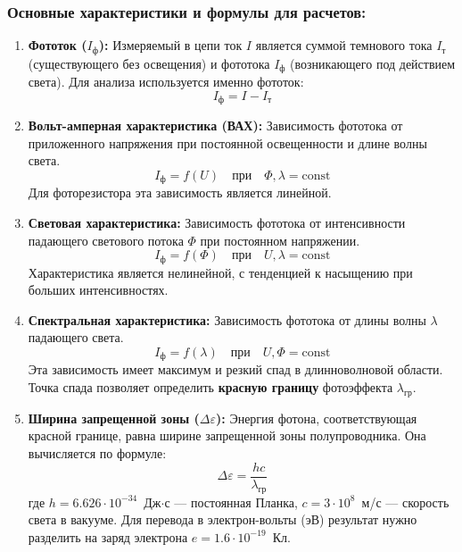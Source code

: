 \subsubsection*{Основные характеристики и формулы для расчетов:}
\begin{enumerate}
    \item \textbf{Фототок ($I_\text{ф}$):} Измеряемый в цепи ток $I$ является суммой темнового тока $I_\text{т}$ (существующего без освещения) и фототока $I_\text{ф}$ (возникающего под действием света). Для анализа используется именно фототок:
    \[ I_\text{ф} = I - I_\text{т} \]
    
    \item \textbf{Вольт-амперная характеристика (ВАХ):} Зависимость фототока от приложенного напряжения при постоянной освещенности и длине волны света.
    \[ I_\text{ф} = f(U) \quad \text{при} \quad \Phi, \lambda = \text{const} \]
    Для фоторезистора эта зависимость является линейной.
    
    \item \textbf{Световая характеристика:} Зависимость фототока от интенсивности падающего светового потока $\Phi$ при постоянном напряжении.
    \[ I_\text{ф} = f(\Phi) \quad \text{при} \quad U, \lambda = \text{const} \]
    Характеристика является нелинейной, с тенденцией к насыщению при больших интенсивностях.
    
    \item \textbf{Спектральная характеристика:} Зависимость фототока от длины волны $\lambda$ падающего света.
    \[ I_\text{ф} = f(\lambda) \quad \text{при} \quad U, \Phi = \text{const} \]
    Эта зависимость имеет максимум и резкий спад в длинноволновой области. Точка спада позволяет определить \textbf{красную границу} фотоэффекта $\lambda_\text{гр}$.
    
    \item \textbf{Ширина запрещенной зоны ($\Delta\varepsilon$):} Энергия фотона, соответствующая красной границе, равна ширине запрещенной зоны полупроводника. Она вычисляется по формуле:
    \[ \Delta\varepsilon = \frac{hc}{\lambda_\text{гр}} \]
    где $h = 6.626 \cdot 10^{-34}$~Дж$\cdot$с --- постоянная Планка, $c = 3 \cdot 10^8$~м/с --- скорость света в вакууме. Для перевода в электрон-вольты (эВ) результат нужно разделить на заряд электрона $e = 1.6 \cdot 10^{-19}$~Кл.
\end{enumerate}










